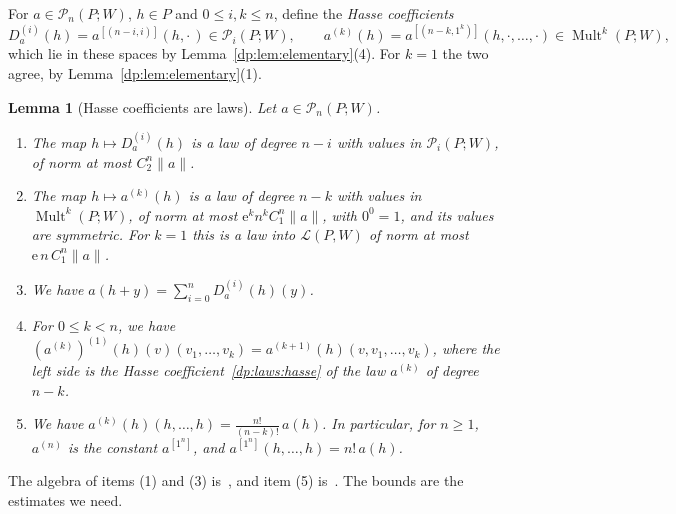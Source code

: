 \documentclass[11pt]{amsart}
\newtheorem{lemma}[theorem]{Lemma}
\theoremstyle{definition}
\theoremstyle{remark}
\numberwithin{equation}{section}
\newcommand{\cL}{\mathcal L}
\newcommand{\Mult}{\operatorname{Mult}}
\newcommand{\norm}[1]{\lVert #1\rVert}
\theoremstyle{plain}
\theoremstyle{definition}
\theoremstyle{plain}
\newcommand{\cP}{\mathcal P}
\begin{document}
For $a\in\cP_n(P;W)$, $h\in P$ and $0\le i,k\le n$, define the \emph{Hasse coefficients}
\begin{equation}\label{dp:laws:hasse}
 D^{(i)}_a(h)=a^{[(n-i,i)]}(h,\cdot\,)\in\cP_i(P;W),\qquad a^{(k)}(h)=a^{[(n-k,1^k)]}(h,\cdot,\dots,\cdot)\in\Mult^k(P;W),
\end{equation}
which lie in these spaces by Lemma~\ref{dp:lem:elementary}(4). For $k=1$ the two agree, by Lemma~\ref{dp:lem:elementary}(1).

\begin{lemma}[Hasse coefficients are laws]\label{dp:lem:hasse-law}
Let $a\in\cP_n(P;W)$.
\begin{enumerate}
\item The map $h\mapsto D^{(i)}_a(h)$ is a law of degree $n-i$ with values in $\cP_i(P;W)$, of norm at most $C_2^n\norm a$.
\item The map $h\mapsto a^{(k)}(h)$ is a law of degree $n-k$ with values in $\Mult^k(P;W)$, of norm at most $\mathrm e^kn^kC_1^n\norm a$, with $0^0=1$, and its values are symmetric. For $k=1$ this is a law into $\cL(P,W)$ of norm at most $\mathrm e\,n\,C_1^n\norm a$.
\item We have $a(h+y)=\sum_{i=0}^nD^{(i)}_a(h)(y)$.
\item For $0\le k<n$, we have $(a^{(k)})^{(1)}(h)(v)(v_1,\dots,v_k)=a^{(k+1)}(h)(v,v_1,\dots,v_k)$, where the left side is the Hasse coefficient~\eqref{dp:laws:hasse} of the law $a^{(k)}$ of degree $n-k$.
\item We have $a^{(k)}(h)(h,\dots,h)=\frac{n!}{(n-k)!}\,a(h)$. In particular, for $n\ge1$, $a^{(n)}$ is the constant $a^{[1^n]}$, and $a^{[1^n]}(h,\dots,h)=n!\,a(h)$.
\end{enumerate}
\end{lemma}

The algebra of items (1) and (3) is~\cite[Prop.~IV.10; II~\S4]{Ro}, and item (5) is~\cite[Th.~II.1]{Ro}. The bounds are the estimates we need.
\end{document}
